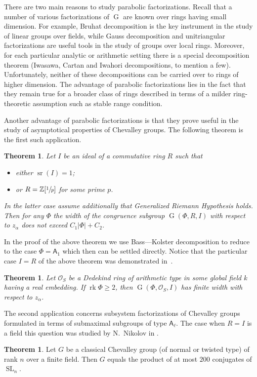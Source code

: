 \documentclass[12pt]{amsart}
\numberwithin{equation}{section}
\newcounter{thmcounter} \newcounter{lemmacounter}
\newtheorem{thm}[thmcounter]{Theorem}
\theoremstyle{definition}
\newtheorem*{thm*}{Theorem}
\DeclareMathOperator{\G}{G}
\DeclareMathOperator{\SL}{SL}
\DeclareMathOperator{\sr}{sr}
\DeclareMathOperator{\rk}{rk}
\newcommand{\rA}{\mathsf{A}}
\begin{document}
There are two main reasons to study parabolic factorizations.
Recall that a number of various factorizations of $\G$ are known over rings having small dimension.
For example, Bruhat decomposition is the key instrument in the study of linear groups over fields, 
 while Gauss decomposition and unitriangular factorizations are useful tools in the study of groups over local rings.
Moreover, for each particular analytic or arithmetic setting there is a special decomposition theorem (Iwasawa, Cartan and Iwahori decompositions, to mention a few).
Unfortunately, neither of these decompositions can be carried over to rings of higher dimension.
The advantage of parabolic factorizations lies in the fact that they remain true for a broader class of rings described in terms of a milder ring-theoretic assumption such as stable range condition.

Another advantage of parabolic factorizations is that they prove useful in the study of asymptotical properties of Chevalley groups.
The following theorem is the first such application. 
\begin{thm} Let $I$ be an ideal of a commutative ring $R$ such that
\begin{itemize} \item either $\sr(I) = 1$;
 \item or $R = \mathbb{Z}[\sfrac{1}{p}]$ for some prime $p$. \end{itemize}
In the latter case assume additionally that Generalized Riemann Hypothesis holds.
Then for any $\Phi$ the width of the congruence subgroup $\G(\Phi, R, I)$ with respect to $z_\alpha$ does not exceed $C_1|\Phi| + C_2$. \end{thm}
\noindent In the proof of the above theorem we use Bass---Kolster decomposition to reduce to the case $\Phi=\rA_1$ which then can be settled directly.
Notice that the particular case $I=R$ of the above theorem was demonstrated in~\cite{VavSmSuUnitrEng}.

\begin{thm}
Let $\mathcal{O}_S$ be a Dedekind ring of arithmetic type in some global field $k$ having a real embedding. If $\rk\Phi\geqslant2$, then $\G(\Phi,\mathcal{O}_S,I)$ has finite width with respect to $z_\alpha$.
\end{thm}

The second application concerns subsystem factorizations of Chevalley groups formulated in terms of submaximal subgroups of type $\rA_\ell$.
The case when $R=I$ is a field this question was studied by N.~Nikolov in \cite{NikProdDecomp}. 
\begin{thm*} Let $G$ be a classical Chevalley group (of normal or twisted type) of rank $n$ over a finite field.
Then $G$ equals the product of at most $200$ conjugates of $\SL_n$. \end{thm*}
\end{document}
